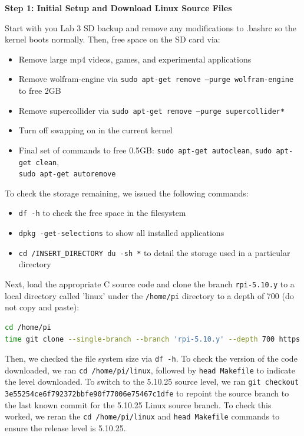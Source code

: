 \documentclass[a4paper,10pt]{article}
\newcommand{\code}[1]{\colorbox{light-gray}{\texttt{#1}}}
\begin{document}
\textbf{Step 1: Initial Setup and Download Linux Source Files}

Start with you Lab 3 SD backup and remove any modifications to .bashrc so the kernel boots normally. Then, free space on the SD card via:

\begin{itemize}
    \item Remove large mp4 videos, games, and experimental applications 
    \item Remove wolfram-engine via \code{sudo apt-get remove --purge wolfram-engine} to free 2GB
    \item Remove supercollider via \code{sudo apt-get remove --purge supercollider*}
    \item Turn off swapping on in the current kernel
    \item Final set of commands to free 0.5GB: \code{sudo apt-get autoclean}, \code{sudo apt-get clean}, \\ \code{sudo apt-get autoremove}
\end{itemize}

To check the storage remaining, we issued the following commands:
\begin{itemize}
    \item \code{df -h} to check the free space in the filesystem
    \item \code{dpkg -get-selections} to show all installed applications
    \item \code{cd /INSERT\_DIRECTORY du -sh *} to detail the storage used in a particular directory
\end{itemize}

Next, load the appropriate C source code and clone the branch \code{rpi-5.10.y} to a local directory called 'linux' under the \code{/home/pi} directory to a depth of 700 (do not copy and paste):
\begin{center}
\begin{lstlisting}[language=bash, label=code:code7] 
cd /home/pi
time git clone --single-branch --branch 'rpi-5.10.y' --depth 700 https://github.com/raspberrypi/linux.git
\end{lstlisting}
\end{center}\vspace{-1em}


Then, we checked the file system size via \code{df -h}. To check the version of the code downloaded, we ran \code{cd /home/pi/linux}, followed by \code{head Makefile} to indicate the level downloaded. To switch to the 5.10.25 source level, we ran \code{git checkout 3e55254ce6f792372bbfe90f77006e75467c1dfe} to repoint the source branch to the last known commit for the 5.10.25 Linux source branch. To check this worked, we reran the \code{cd /home/pi/linux} and \code{head Makefile} commands to ensure the release level is 5.10.25. 
\end{document}
